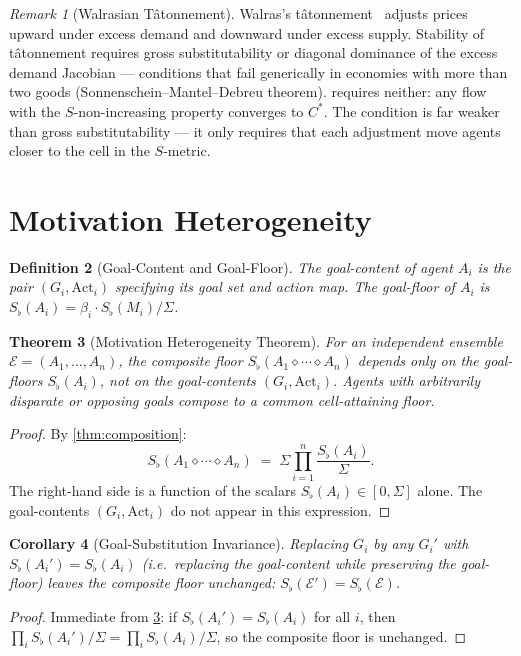 \documentclass[twocolumn,11pt,a4paper]{article}
\newtheorem{theorem}{Theorem}[section]
\newtheorem{corollary}[theorem]{Corollary}
\newtheorem{definition}[theorem]{Definition}
\theoremstyle{remark}
\newtheorem{remark}[theorem]{Remark}
\newcommand{\Sflat}{S_{\flat}}
\newcommand{\Act}{\mathrm{Act}}
\newcommand{\Compose}{\diamond}           %
\newcommand{\Ens}{\mathcal{E}}            %
\begin{document}
\begin{remark}[Walrasian T\^atonnement]
\label{rem:tatonnement}
Walras's t\^atonnement~\cite{walras1874} adjusts prices upward under excess
demand and downward under excess supply.  Stability of t\^atonnement requires
gross substitutability or diagonal dominance of the excess demand
Jacobian — conditions that fail generically in economies with more than
two goods (Sonnenschein--Mantel--Debreu theorem).  
requires neither: any flow with the $S$-non-increasing property converges
to $C^*$.  The condition is far weaker than gross substitutability — it
only requires that each adjustment move agents closer to the cell in the
$S$-metric.
\end{remark}

\section{Motivation Heterogeneity}
\label{sec:motivation}

\begin{definition}[Goal-Content and Goal-Floor]
\label{def:goal-floor}
The \emph{goal-content} of agent $A_i$ is the pair $(G_i, \Act_i)$
specifying its goal set and action map.  The \emph{goal-floor} of $A_i$ is
$\Sflat(A_i) = \beta_i \cdot \Sflat(M_i)/\Sigma$.
\end{definition}

\begin{theorem}[Motivation Heterogeneity Theorem]
\label{thm:motivation-heterogeneity}
For an independent ensemble $\Ens = (A_1, \ldots, A_n)$, the composite floor
$\Sflat(A_1 \Compose \cdots \Compose A_n)$ depends only on the goal-floors
$\Sflat(A_i)$, not on the goal-contents $(G_i, \Act_i)$.  Agents with
arbitrarily disparate or opposing goals compose to a common cell-attaining
floor.
\end{theorem}
\begin{proof}
By \cref{thm:composition}:
\[
  \Sflat(A_1 \Compose \cdots \Compose A_n)
  \;=\; \Sigma \prod_{i=1}^n \frac{\Sflat(A_i)}{\Sigma}.
\]
The right-hand side is a function of the scalars $\Sflat(A_i) \in [0,\Sigma]$
alone.  The goal-contents $(G_i, \Act_i)$ do not appear in this expression.
\end{proof}

\begin{corollary}[Goal-Substitution Invariance]
\label{cor:goal-substitution}
Replacing $G_i$ by any $G_i'$ with $\Sflat(A_i') = \Sflat(A_i)$ (i.e.\
replacing the goal-content while preserving the goal-floor) leaves the
composite floor unchanged: $\Sflat(\Ens') = \Sflat(\Ens)$.
\end{corollary}
\begin{proof}
Immediate from \cref{thm:motivation-heterogeneity}: if $\Sflat(A_i') =
\Sflat(A_i)$ for all $i$, then $\prod_i \Sflat(A_i')/\Sigma = \prod_i
\Sflat(A_i)/\Sigma$, so the composite floor is unchanged.
\end{proof}
\end{document}
